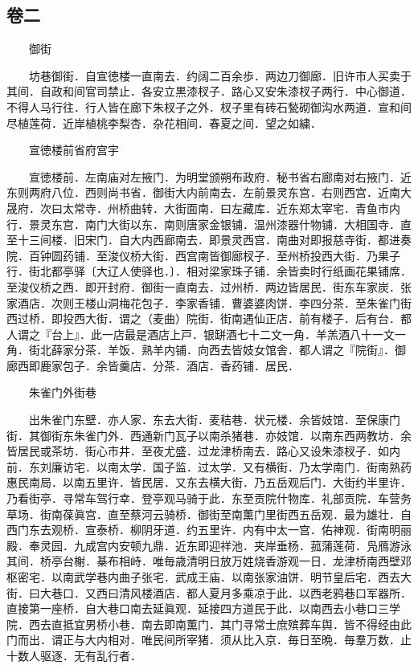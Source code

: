 \hypertarget{ux5377ux4e8c}{%
\subsection{卷二}\label{ux5377ux4e8c}}

　　御街

　　坊巷御街．自宣徳楼一直南去．约阔二百余歩．两边刀御廊．旧许市人买卖于其间．自政和间官司禁止．各安立黒漆杈子．路心又安朱漆杈子两行．中心御道．不得人马行往．行人皆在廊下朱杈子之外．杈子里有砖石甃砌御沟水两道．宣和间尽植莲荷．近岸植桃李梨杏．杂花相间．春夏之间．望之如繍．

　　宣徳楼前省府宫宇

　　宣徳楼前．左南庙对左掖门．为明堂颁朔布政府．秘书省右廊南对右掖门．近东则两府八位．西则尚书省．御街大内前南去．左前景灵东宫．右则西宫．近南大晟府．次曰太常寺．州桥曲转．大街面南．曰左藏库．近东郑太宰宅．青鱼市内行．景灵东宫．南门大街以东．南则唐家金银铺．温州漆器什物铺．大相国寺．直至十三间楼．旧宋门．自大内西廊南去．即景灵西宫．南曲对即报慈寺街．都进奏院．百钟圆药铺．至浚仪桥大街．西宫南皆御廊杈子．至州桥投西大街．乃果子行．街北都亭驿〔大辽人使驿也．〕．相对梁家珠子铺．余皆卖时行纸画花果铺席．至浚仪桥之西．即开封府．御街一直南去．过州桥．两边皆居民．街东车家炭．张家酒店．次则王楼山洞梅花包子．李家香铺．曹婆婆肉饼．李四分茶．至朱雀门街西过桥．即投西大街．谓之（麦曲）院街．街南遇仙正店．前有楼子．后有台．都人谓之『台上』．此一店最是酒店上戸．银缾酒七十二文一角．羊羔酒八十一文一角．街北薛家分茶．羊饭．熟羊内铺．向西去皆妓女馆舎．都人谓之『院街』．御廊西即鹿家包子．余皆羹店．分茶．酒店．香药铺．居民．

　　朱雀门外街巷

　　出朱雀门东壁．亦人家．东去大街．麦秸巷．状元楼．余皆妓馆．至保康门街．其御街东朱雀门外．西通新门瓦子以南杀猪巷．亦妓馆．以南东西两教坊．余皆居民或茶坊．街心市井．至夜尤盛．过龙津桥南去．路心又设朱漆杈子．如内前．东刘廉访宅．以南太学．国子监．过太学．又有横街．乃太学南门．街南熟药惠民南局．以南五里许．皆民居．又东去横大街．乃五岳观后门．大街约半里许．乃看街亭．寻常车驾行幸．登亭观马骑于此．东至贡院什物库．礼部贡院．车营务草场．街南葆眞宫．直至蔡河云骑桥．御街至南薫门里街西五岳观．最为雄壮．自西门东去观桥．宣泰桥．柳阴牙道．约五里许．内有中太一宫．佑神观．街南明丽殿．奉灵园．九成宫内安顿九鼎．近东即迎祥池．夹岸垂杨．菰蒲莲荷．凫鴈游泳其间．桥亭台榭．棊布相峙．唯毎歳清明日放万姓烧香游观一日．龙津桥南西壁邓枢密宅．以南武学巷内曲子张宅．武成王庙．以南张家油饼．明节皇后宅．西去大街．曰大巷口．又西曰清风楼酒店．都人夏月多乘凉于此．以西老鸦巷口军器所．直接第一座桥．自大巷口南去延眞观．延接四方道民于此．以南西去小巷口三学院．西去直抵宜男桥小巷．南去即南薫门．其门寻常士庶殡葬车舆．皆不得经由此门而出．谓正与大内相对．唯民间所宰猪．须从比入京．毎日至晩．毎羣万数．止十数人驱逐．无有乱行者．

